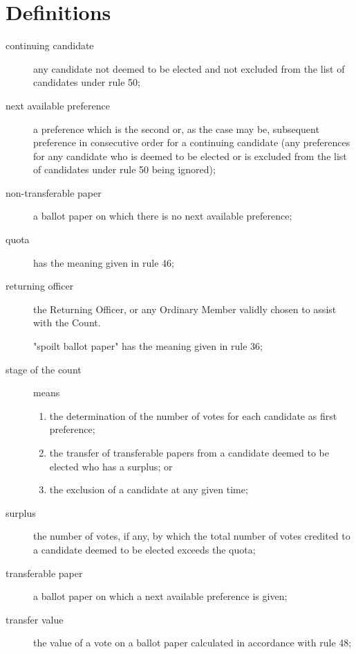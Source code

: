 \section{Definitions} \label{STV:Defs}
\begin{description}
\item[continuing candidate] any candidate not deemed to be elected and not excluded from the list of candidates under rule 50;

\item[next available preference] a preference which is the second or, as the case may be, subsequent preference in consecutive order for a continuing candidate (any preferences for any candidate who is deemed to be elected or is excluded from the list of candidates under rule 50 being ignored);
\item[non-transferable paper] a ballot paper on which there is no next available preference;
\item[quota] has the meaning given in rule 46;
\item[returning officer] the Returning Officer, or any Ordinary Member validly chosen to assist with the Count.

"spoilt ballot paper" has the meaning given in rule 36;

\item[stage of the count] means
\begin{enumerate}
    \item the determination of the number of votes for each candidate as first preference;
    \item the transfer of transferable papers from a candidate deemed to be elected who has a surplus; or
    \item the exclusion of a candidate at any given time;
\end{enumerate}

\item[surplus] the number of votes, if any, by which the total number of votes credited to a candidate deemed to be elected exceeds the quota;

\item[transferable paper] a ballot paper on which a next available preference is given;

\item[transfer value] the value of a vote on a ballot paper calculated in accordance with rule 48;

\end{description}